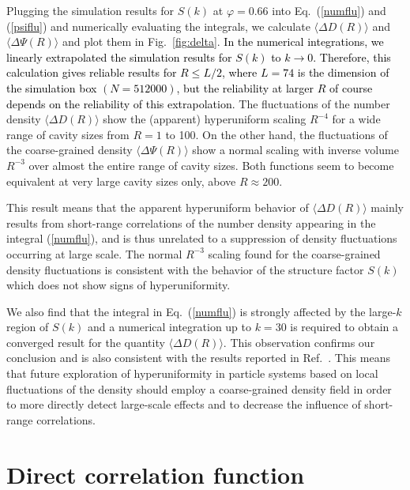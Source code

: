 \documentclass[aps,pre,twocolumn,superscriptaddress]{revtex4-1}
\newcommand{\red}[1]{\textcolor{black}{#1}}
\newcommand{\ave}[1]{\langle {#1} \rangle}
\begin{document}
Plugging the simulation results for $S(k)$ at $\varphi=0.66$ 
into Eq.~(\ref{numflu}) and (\ref{psiflu})
and numerically evaluating the integrals, 
we calculate $\ave{\Delta D (R)}$ and $\ave{\Delta \Psi (R)}$ and plot 
them in Fig.~\ref{fig:delta}. 
\red{In the numerical integrations, we linearly extrapolated the simulation results for $S(k)$ to $k \to 0$. 
Therefore, this calculation gives reliable results for $R \leq L/2$, where $L=74$ is the dimension of the simulation box $(N=512000)$, but the reliability at larger $R$ of course depends on the reliability of this extrapolation.}
The fluctuations of the number density $\ave{\Delta D (R)}$ show 
the (apparent) hyperuniform scaling $R^{-4}$ for a wide range of cavity 
sizes from $R=1$ to 100. 
On the other hand, the fluctuations of the coarse-grained density 
$\ave{\Delta \Psi (R)}$ 
show a normal scaling with inverse volume $R^{-3}$ over almost 
the entire range of cavity sizes. Both functions 
seem to become equivalent at 
very large cavity sizes only, above $R \approx 200$.
 
This result means that the apparent
hyperuniform behavior of $\ave{\Delta D (R)}$ 
mainly results from
short-range correlations of the number density 
appearing in the integral 
(\ref{numflu}), and is thus unrelated to a suppression of 
density fluctuations occurring at large scale. 
The normal $R^{-3}$ scaling found for the coarse-grained density 
fluctuations is consistent with the behavior of the structure factor 
$S(k)$ which does not show signs of hyperuniformity.

We also find that the integral in Eq.~(\ref{numflu}) is strongly 
affected by the large-$k$ region of $S(k)$ 
and a numerical integration up to $k=30$ is required to obtain a 
converged result for the quantity $\ave{\Delta D (R)}$.  
This observation confirms our conclusion and is also consistent with the 
results reported in Ref.~\cite{wu2015}. This means that 
future exploration of hyperuniformity in 
particle systems based on local fluctuations of the density
should employ a coarse-grained density field in order to 
more directly detect large-scale effects and to decrease
the influence of short-range correlations.

\section{Direct correlation function}
\label{sec:cr}
\end{document}
